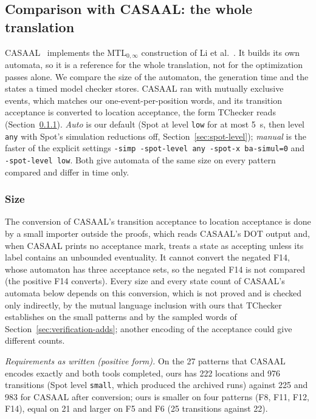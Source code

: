 \subsection{Comparison with CASAAL: the whole translation}
\label{sec:casaal-eval}
CASAAL~\cite{casaal_tool} implements the MTL$_{0,\infty}$ construction of Li et al.~\cite{li_spin7}. It builds its own automata, so it is a reference for the whole translation, not for the optimization passes alone. We compare the size of the automaton, the generation time and the states a timed model checker stores. CASAAL ran with mutually exclusive events, which matches our one-event-per-position words, and its transition acceptance is converted to location acceptance, the form TChecker reads (Section~\ref{sec:casaal-size}). \emph{Auto} is our default (Spot at level \texttt{low} for at most 5~s, then level \texttt{any} with Spot's simulation reductions off, Section~\ref{sec:spot-level}); \emph{manual} is the faster of the explicit settings \texttt{-simp -spot-level any -spot-x ba-simul=0} and \texttt{-spot-level low}. Both give automata of the same size on every pattern compared and differ in time only.

\subsubsection{Size}
\label{sec:casaal-size}
The conversion of CASAAL's transition acceptance to location acceptance is done
by a small importer outside the proofs, which reads CASAAL's DOT output and, when
CASAAL prints no acceptance mark, treats a state as accepting unless its label
contains an unbounded eventuality. It cannot convert the negated F14, whose automaton has three
acceptance sets, so the negated F14 is not compared (the positive F14 converts). Every size and every state count of CASAAL's automata below depends on this conversion, which is not proved and is checked only indirectly, by the mutual language inclusion with ours that TChecker establishes on the small patterns and by the sampled words of Section~\ref{sec:verification-adds}; another encoding of the acceptance could give different counts.

\emph{Requirements as written (positive form).} On the 27 patterns that CASAAL encodes exactly and both tools completed, ours has 222 locations and 976 transitions (Spot level \texttt{small}, which produced the archived runs) against 225 and 983 for CASAAL after conversion; ours is smaller on four patterns (F8, F11, F12, F14), equal on 21 and larger on F5 and F6 (25 transitions against 22).

